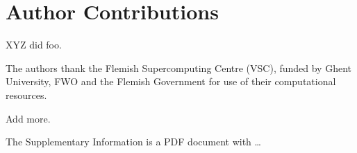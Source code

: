 \documentclass[journal=jctcce,manuscript=article,layout=traditional,]{achemso}
\begin{document}
    \section*{Author Contributions}
    \label{sec:author-contributions}

    XYZ did foo.

    \begin{acknowledgement}
    The authors thank the Flemish Supercomputing Centre (VSC),
    funded by Ghent University,
    FWO and the Flemish Government for use of their computational resources.

    Add more.
    \end{acknowledgement}

    \begin{suppinfo}
    The Supplementary Information is a PDF document with \ldots
    \end{suppinfo}

    
\end{document}
